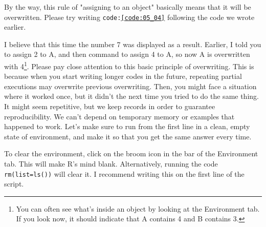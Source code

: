\documentclass{ltjsbook}
\begin{document}
By the way, this rule of "assigning to an object" basically means that it will be overwritten. Please try writing \texttt{code:\ref{code:05_04}} following the code we wrote earlier.

I believe that this time the number 7 was displayed as a result. Earlier, I told you to assign 2 to A, and then command to assign 4 to A, so now A is overwritten with 4\footnote{You can often see what's inside an object by looking at the Environment tab. If you look now, it should indicate that A contains 4 and B contains 3.}. Please pay close attention to this basic principle of overwriting. This is because when you start writing longer codes in the future, repeating partial executions may overwrite previous overwriting. Then, you might face a situation where it worked once, but it didn’t the next time you tried to do the same thing. It might seem repetitive, but we keep records in order to guarantee reproducibility. We can't depend on temporary memory or examples that happened to work. Let's make sure to run from the first line in a clean, empty state of environment, and make it so that you get the same answer every time.

To clear the environment, click on the broom icon in the bar of the Environment tab. This will make R's mind blank. Alternatively, running the code \texttt{rm(list=ls())} will clear it. I recommend writing this on the first line of the script.
\end{document}
